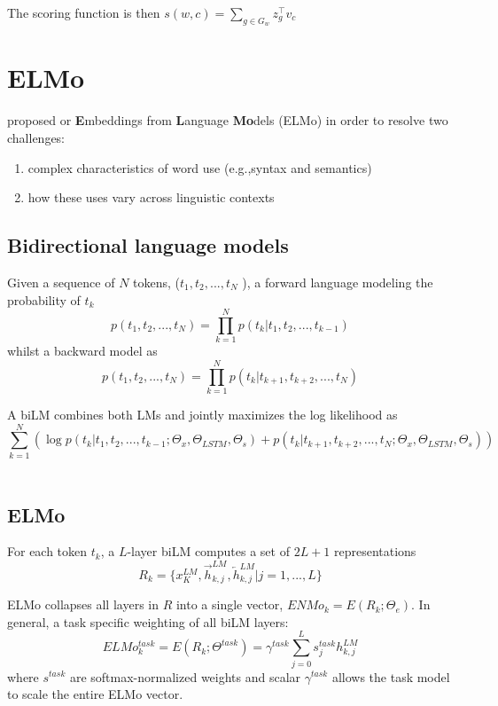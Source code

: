 \documentclass[a3paper, 12pt]{book} %
\begin{document}
The scoring function is then $s(w,c)=\sum_{g\in G_w}{z_g^{\top}v_c}$ 


\section{ELMo}
\citep{peters2018deep} proposed or \textbf{E}mbeddings from \textbf{L}anguage \textbf{Mo}dels (ELMo) in order to resolve two challenges:
\begin{enumerate}
	\item complex characteristics of word use (e.g.,syntax and semantics)
	\item how these uses vary across linguistic contexts \\
\end{enumerate} 

\subsection{Bidirectional language models}

Given a sequence of $N$ tokens, ($t_1, t_2 , ..., t_N$ ), a forward language modeling the probability of $t_k$
$$p(t_1,t_2,...,t_N)=\prod_{k=1}^{N}{p(t_k|t_1,t_2,...,t_{k-1})}$$
whilst a backward model as 
$$p(t_1,t_2,...,t_N)=\prod_{k=1}^{N}{p(t_k|t_{k+1},t_{k+2},...,t_{N})}$$

A biLM combines both LMs and jointly maximizes the log likelihood as 
$$\sum_{k=1}^{N}{(\log{p(t_k|t_1,t_2,...,t_{k-1};\Theta_x,\Theta_{LSTM},\Theta_{s}) + p(t_k|t_{k+1},t_{k+2},...,t_{N};\Theta_x, \Theta_{LSTM},\Theta_s)})}$$ \\


\subsection{ELMo}

For each token $t_k$, a $L$-layer biLM computes a set of $2L+1$ representations
$$R_k = \{x_K^{LM}, \overrightarrow{h}_{k,j}^{LM}, \overleftarrow{h}_{k,j}^{LM} |j=1,...,L\}$$

ELMo collapses all layers in $R$ into a single vector, $ENMo_k=E(R_k;\Theta_{e})$.
In general, a task specific weighting of all biLM layers: 
$$ELMo_{k}^{task}=E(R_k;\Theta^{task})=\gamma^{task}\sum_{j=0}^{L}{s_j^{task}h_{k,j}^{LM}}$$
where $s^{task}$ are softmax-normalized weights and scalar $\gamma^{task}$ allows the task model to scale the entire ELMo vector.
\end{document}
